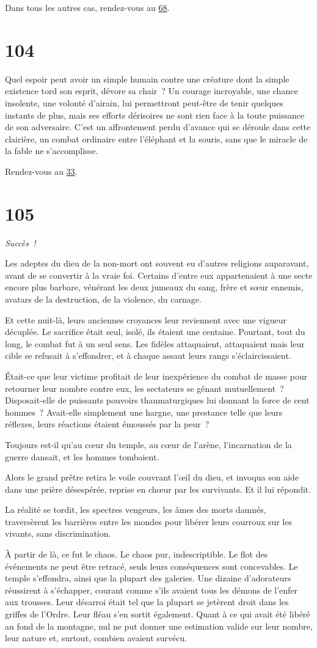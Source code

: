 \documentclass{report}
\newcommand{\gsection}[1]{
    \section{#1}
    \label{section-#1}
}
\newcommand{\glink}[1]{\hyperref[section-#1]{#1}}
\newcommand{\success}{\emph{Succès !}}
\begin{document}
Dans tous les autres cas, rendez-vous au \glink{68}.

\gsection{104}

Quel espoir peut avoir un simple humain contre une créature dont la simple existence tord son esprit, dévore sa chair ? Un courage incroyable, une chance insolente, une volonté d'airain, lui permettront peut-être de tenir quelques instants de plus, mais ses efforts dérisoires ne sont rien face à la toute puissance de son adversaire. C'est un affrontement perdu d'avance qui se déroule dans cette clairière, un combat ordinaire entre l'éléphant et la souris, sans que le miracle de la fable ne s'accomplisse.

Rendez-vous au \glink{33}.

\gsection{105}

\success

Les adeptes du dieu de la non-mort ont souvent eu d'autres religions auparavant, avant de se convertir à la vraie foi. Certains d'entre eux appartenaient à une secte encore plus barbare, vénérant les deux jumeaux du sang, frère et sœur ennemis, avatars de la destruction, de la violence, du carnage.

Et cette nuit-là, leurs anciennes croyances leur reviennent avec une vigueur décuplée. Le sacrifice était seul, isolé, ils étaient une centaine. Pourtant, tout du long, le combat fut à un seul sens. Les fidèles attaquaient, attaquaient mais leur cible se refusait à s'effondrer, et à chaque assaut leurs rangs s'éclaircissaient.

Était-ce que leur victime profitait de leur inexpérience du combat de masse pour retourner leur nombre contre eux, les sectateurs se gênant mutuellement ? Disposait-elle de puissants pouvoirs thaumaturgiques lui donnant la force de cent hommes ? Avait-elle simplement une hargne, une prestance telle que leurs réflexes, leurs réactions étaient émoussés par la peur ?

Toujours est-il qu'au cœur du temple, au cœur de l'arène, l'incarnation de la guerre dansait, et les hommes tombaient.

Alors le grand prêtre retira le voile couvrant l’œil du dieu, et invoqua son aide dans une prière désespérée, reprise en chœur par les survivants. Et il lui répondit.

La réalité se tordit, les spectres vengeurs, les âmes des morts damnés, traversèrent les barrières entre les mondes pour libérer leurs courroux sur les vivants, sans discrimination.

À partir de là, ce fut le chaos. Le chaos pur, indescriptible. Le flot des événements ne peut être retracé, seuls leurs conséquences sont concevables. Le temple s'effondra, ainsi que la plupart des galeries. Une dizaine d'adorateurs réussirent à s'échapper, courant comme s'ils avaient tous les démons de l'enfer aux trousses. Leur désarroi était tel que la plupart se jetèrent droit dans les griffes de l'Ordre. Leur fléau s'en sortit également. Quant à ce qui avait été libéré au fond de la montagne, nul ne put donner une estimation valide sur leur nombre, leur nature et, surtout, combien avaient survécu.
\end{document}
